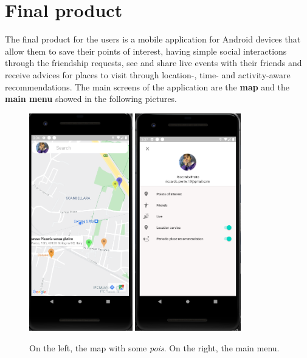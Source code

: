 \documentclass[../main]{subfiles}
\begin{document}
\section{Final product}
\label{s:app}

The final product for the users is a mobile application for Android devices that allow them to save their points of interest, having simple social interactions 
through the friendship requests, see and share live events with their friends and receive advices for places to visit through location-, time- and activity-aware recommendations.
The main screens of the application are the \textbf{map} and the \textbf{main menu} showed in the following pictures.
\begin{figure}[H]
    \centering
    \includegraphics[width=0.4\textwidth]{images/app/app_overview}
    \includegraphics[width=0.41\textwidth]{images/app/main_menu}
    \caption{On the left, the map with some \textit{pois}. On the right, the main menu.}
\end{figure}






\end{document}
